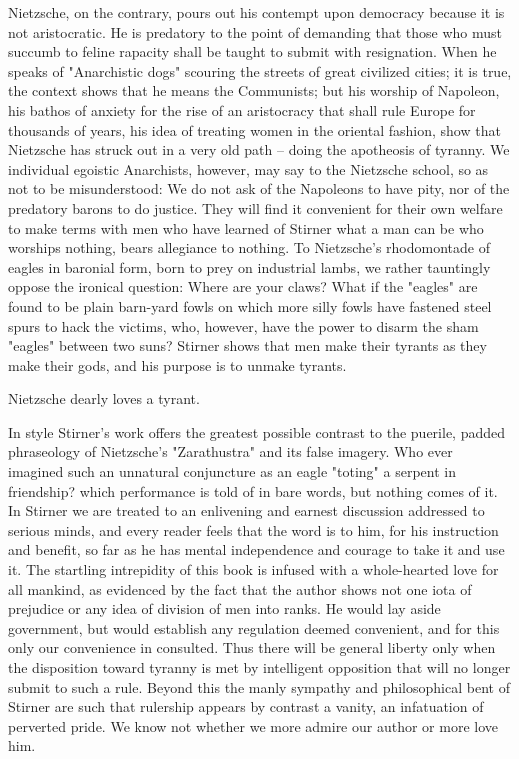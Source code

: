 \documentclass[a4paper]{book}
\begin{document}
Nietzsche, on the contrary, pours out his contempt upon democracy because it 
is not aristocratic. He is predatory to the point of demanding that those who 
must succumb to feline rapacity shall be taught to submit with resignation. 
When he speaks of "{}Anarchistic dogs"{} scouring the streets of great 
civilized cities; it is true, the context shows that he means the Communists; 
but his worship of Napoleon, his bathos of anxiety for the rise of an 
aristocracy that shall rule Europe for thousands of years, his idea of 
treating women in the oriental fashion, show that Nietzsche has struck out in 
a very old path -- doing the apotheosis of tyranny. We individual egoistic 
Anarchists, however, may say to the Nietzsche school, so as not to be 
misunderstood: We do not ask of the Napoleons to have pity, nor of the 
predatory barons to do justice. They will find it convenient for their own 
welfare to make terms with men who have learned of Stirner what a man can be 
who worships nothing, bears allegiance to nothing. To Nietzsche's rhodomontade 
of eagles in baronial form, born to prey on industrial lambs, we rather 
tauntingly oppose the ironical question: Where are your claws? What if the 
"{}eagles"{} are found to be plain barn-yard fowls on which more silly fowls 
have fastened steel spurs to hack the victims, who, however, have the power to 
disarm the sham "{}eagles"{} between two suns? Stirner shows that men make 
their tyrants as they make their gods, and his purpose is to unmake tyrants.

Nietzsche dearly loves a tyrant.

In style Stirner's work offers the greatest possible contrast to the puerile, 
padded phraseology of Nietzsche's "{}Zarathustra"{} and its false imagery. Who 
ever imagined such an unnatural conjuncture as an eagle "{}toting"{} a serpent 
in friendship? which performance is told of in bare words, but nothing comes 
of it. In Stirner we are treated to an enlivening and earnest discussion 
addressed to serious minds, and every reader feels that the word is to him, 
for his instruction and benefit, so far as he has mental independence and 
courage to take it and use it. The startling intrepidity of this book is 
infused with a whole-hearted love for all mankind, as evidenced by the fact 
that the author shows not one iota of prejudice or any idea of division of men 
into ranks. He would lay aside government, but would establish any regulation 
deemed convenient, and for this only our convenience in consulted. Thus there 
will be general liberty only when the disposition toward tyranny is met by 
intelligent opposition that will no longer submit to such a rule. Beyond this 
the manly sympathy and philosophical bent of Stirner are such that rulership 
appears by contrast a vanity, an infatuation of perverted pride. We know not 
whether we more admire our author or more love him.
\end{document}

